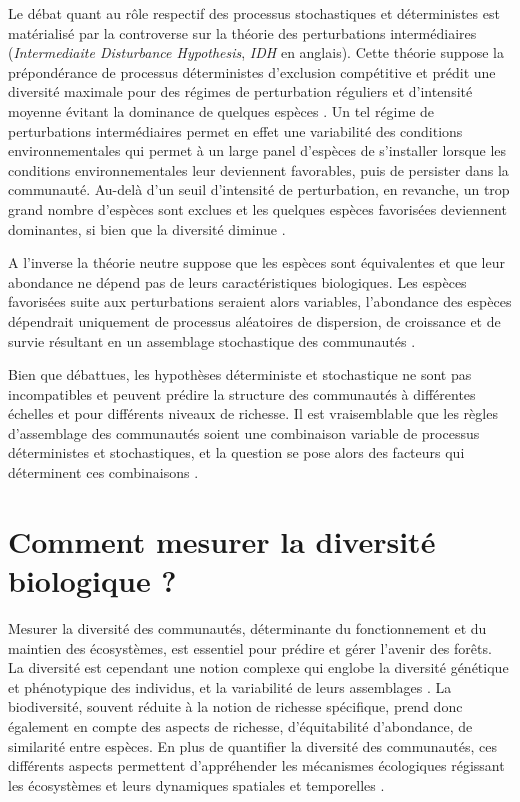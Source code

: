 \documentclass[
  11pt,
  french,
  A4paper,
  extrafontsizes,onecolumn,openright
  ]{memoir}
\begin{document}
Le débat quant au rôle respectif des processus stochastiques et
déterministes est matérialisé par la controverse sur la théorie des
perturbations intermédiaires (\emph{Intermediaite Disturbance
Hypothesis}, \emph{IDH} en anglais). Cette théorie suppose la
prépondérance de processus déterministes d'exclusion compétitive et
prédit une diversité maximale pour des régimes de perturbation réguliers
et d'intensité moyenne évitant la dominance de quelques espèces
\autocite{Molino2001}. Un tel régime de perturbations intermédiaires
permet en effet une variabilité des conditions environnementales qui
permet à un large panel d'espèces de s'installer lorsque les conditions
environnementales leur deviennent favorables, puis de persister dans la
communauté. Au-delà d'un seuil d'intensité de perturbation, en revanche,
un trop grand nombre d'espèces sont exclues et les quelques espèces
favorisées deviennent dominantes, si bien que la diversité diminue
\autocites{Chesson2000}{Kariuki2006a}{Berry2008a}.

A l'inverse la théorie neutre suppose que les espèces sont équivalentes
et que leur abondance ne dépend pas de leurs caractéristiques
biologiques. Les espèces favorisées suite aux perturbations seraient
alors variables, l'abondance des espèces dépendrait uniquement de
processus aléatoires de dispersion, de croissance et de survie résultant
en un assemblage stochastique des communautés \autocite{Hubbell2001}.

Bien que débattues, les hypothèses déterministe et stochastique ne sont
pas incompatibles et peuvent prédire la structure des communautés à
différentes échelles et pour différents niveaux de richesse. Il est
vraisemblable que les règles d'assemblage des communautés soient une
combinaison variable de processus déterministes et stochastiques, et la
question se pose alors des facteurs qui déterminent ces combinaisons
\autocite{Chave2004}.

\section{Comment mesurer la diversité biologique
?}\label{comment-mesurer-la-diversite-biologique}

Mesurer la diversité des communautés, déterminante du fonctionnement et
du maintien des écosystèmes, est essentiel pour prédire et gérer
l'avenir des forêts. La diversité est cependant une notion complexe qui
englobe la diversité génétique et phénotypique des individus, et la
variabilité de leurs assemblages \autocite{Loreau2005}. La biodiversité,
souvent réduite à la notion de richesse spécifique, prend donc également
en compte des aspects de richesse, d'équitabilité d'abondance, de
similarité entre espèces. En plus de quantifier la diversité des
communautés, ces différents aspects permettent d'appréhender les
mécanismes écologiques régissant les écosystèmes et leurs dynamiques
spatiales et temporelles \autocites{Purvis2000}{Loreau2005}.
\end{document}
